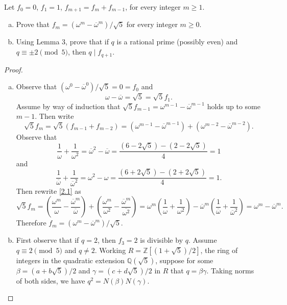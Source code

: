 \documentclass[10pt]{amsart}
\begin{document}
\begin{thm}
	Let $f_0 = 0$, $f_1 = 1$, $f_{m+1} = f_m + f_{m-1}$, for every integer $m \geq 1$.
	\begin{enumerate}[(a)]
		\item
			Prove that $f_m = (\omega^m - \overline{\omega}^m)/\sqrt{5}$ for every integer $m \geq 0$.
		\item
			Using Lemma 3, prove that if $q$ is a rational prime (possibly even) and $q \equiv \pm 2 \pmod{5}$, then $q \mid f_{q+1}$.
	\end{enumerate}
	\begin{proof}
	\begin{enumerate}[(a)]
		\item
			Observe that $(\omega^0 - \overline{\omega}^0)/\sqrt{5} = 0 = f_0$ and 
			$$\omega - \overline{\omega} = \sqrt{5} = \sqrt{5}f_1.$$
			Assume by way of induction that $\sqrt{5}f_{m-1} = \omega^{m-1} - \overline{\omega}^{m-1}$ holds up to some $m-1$.
			Then write 
			\begin{equation}\label{2.1}
				\sqrt{5}f_m = \sqrt{5}(f_{m-1} + f_{m-2}) = (\omega^{m-1} - \overline{\omega}^{m-1}) + (\omega^{m-2} - \overline{\omega}^{m-2}).
			\end{equation}
			Observe that $$\frac{1}{\omega} + \frac{1}{\omega^2} = \overline{\omega}^2 - \overline{\omega} = \frac{(6 - 2\sqrt{5}) - (2 - 2\sqrt{5})}{4} = 1$$
			and
			$$\frac{1}{\overline{\omega}} + \frac{1}{\overline{\omega}^2} = \omega^2 - \omega = \frac{(6 + 2\sqrt{5}) - (2 + 2\sqrt{5})}{4} = 1.$$
			Then rewrite \eqref{2.1} as 
			\begin{equation}\label{2.2}
			\sqrt{5}f_m = \left(\frac{\omega^m}{\omega} - \frac{\overline{\omega}^m}{\overline{\omega}}\right) + \left(\frac{\omega^m}{\omega^2} - \frac{\overline{\omega}^m}{\overline{\omega^2}}\right) = \omega^m\left(\frac{1}{\omega} + \frac{1}{\omega^2}\right) - \overline{\omega}^m\left(\frac{1}{\overline{\omega}} + \frac{1}{\overline{\omega}^2}\right) = \omega^m - \overline{\omega}^m.
			\end{equation}
			Therefore $f_m = (\omega^m - \overline{\omega}^m)/\sqrt{5}$.
		\item
			First observe that if $q = 2$, then $f_3 = 2$ is divisible by $q$.
			Assume $q \equiv 2 \pmod{5}$ and $q \not = 2$.
			Working $R = \mathbb{Z}[(1 + \sqrt{5})/2]$, the ring of integers in the quadratic extension $\mathbb{Q}(\sqrt{5})$, suppose for some $\beta = (a + b\sqrt{5})/2$ and $\gamma = (c + d\sqrt{5})/2$ in $R$ that $q = \beta\gamma$.
			Taking norms of both sides, we have $q^2 = N(\beta)N(\gamma)$.

\end{enumerate}
\end{proof}
\end{thm}
\end{document}
